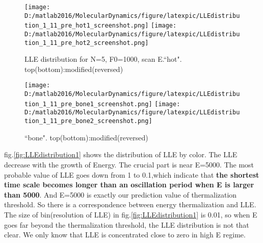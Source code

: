 \documentclass[aps,pre,twocolumn,groupedaddress]{revtex4-1}
\begin{document}
\begin{figure}[hbtp]
\centering
\texttt{[image: D:/matlab2016/MolecularDynamics/figure/latexpic/LLEdistribution\_1\_11\_pre\_hot1\_screenshot.png]}
\texttt{[image: D:/matlab2016/MolecularDynamics/figure/latexpic/LLEdistribution\_1\_11\_pre\_hot2\_screenshot.png]}
\caption{LLE distribution for N=5, F0=1000, scan E.``hot". top(bottom):modified(reversed)}
\end{figure}
\begin{figure}[hbtp]
\centering
\texttt{[image: D:/matlab2016/MolecularDynamics/figure/latexpic/LLEdistribution\_1\_11\_pre\_bone1\_screenshot.png]}
\texttt{[image: D:/matlab2016/MolecularDynamics/figure/latexpic/LLEdistribution\_1\_11\_pre\_bone2\_screenshot.png]}
\caption{``bone". top(bottom):modified(reversed)}
\end{figure}


fig.\ref{fig:LLEdistribution1} shows the distribution of LLE by color. The LLE decrease with the growth of Energy. The crucial part is near E=5000. The most probable value of LLE goes down from 1 to 0.1,which indicate that \textbf{the shortest time scale becomes longer than an oscillation period when E is larger than 5000}. And E=5000 is exactly our prediction value of thermalization threshold. So there is a correspondence between energy thermalization and LLE. 
The size of bin(resolution of LLE) in fig.\ref{fig:LLEdistribution1} is 0.01, so when E goes far beyond the thermalization threshold, the LLE distribution is not that clear. We only know that LLE is concentrated close to zero in high E regime.

\end{document}
